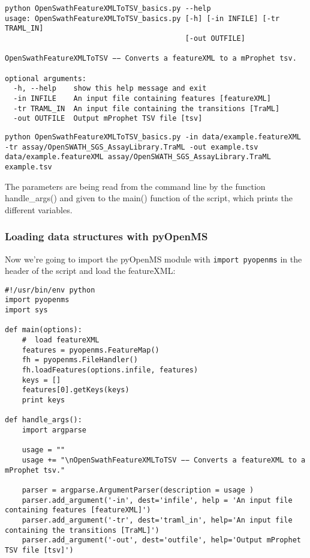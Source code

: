 {\begin{lstlisting}
python OpenSwathFeatureXMLToTSV_basics.py --help
usage: OpenSwathFeatureXMLToTSV_basics.py [-h] [-in INFILE] [-tr TRAML_IN]
                                          [-out OUTFILE]

OpenSwathFeatureXMLToTSV −− Converts a featureXML to a mProphet tsv.

optional arguments:
  -h, --help    show this help message and exit
  -in INFILE    An input file containing features [featureXML]
  -tr TRAML_IN  An input file containing the transitions [TraML]
  -out OUTFILE  Output mProphet TSV file [tsv]
\end{lstlisting}

\begin{lstlisting}
python OpenSwathFeatureXMLToTSV_basics.py -in data/example.featureXML -tr assay/OpenSWATH_SGS_AssayLibrary.TraML -out example.tsv  
data/example.featureXML assay/OpenSWATH_SGS_AssayLibrary.TraML example.tsv
\end{lstlisting}

The parameters are being read from the command line by the function handle\_args() and given to the main() function of the script, which prints the different variables.

\subsubsection{Loading data structures with pyOpenMS}
Now we're going to import the pyOpenMS module with \texttt{import pyopenms} in the header of the script and load the featureXML:

\begin{lstlisting}
#!/usr/bin/env python
import pyopenms
import sys

def main(options):
    #  load featureXML
    features = pyopenms.FeatureMap()
    fh = pyopenms.FileHandler()
    fh.loadFeatures(options.infile, features)
    keys = []
    features[0].getKeys(keys)
    print keys

def handle_args():
    import argparse

    usage = ""
    usage += "\nOpenSwathFeatureXMLToTSV −− Converts a featureXML to a mProphet tsv."

    parser = argparse.ArgumentParser(description = usage )
    parser.add_argument('-in', dest='infile', help = 'An input file containing features [featureXML]')
    parser.add_argument('-tr', dest='traml_in', help='An input file containing the transitions [TraML]')
    parser.add_argument('-out', dest='outfile', help='Output mProphet TSV file [tsv]')


\end{lstlisting}}
